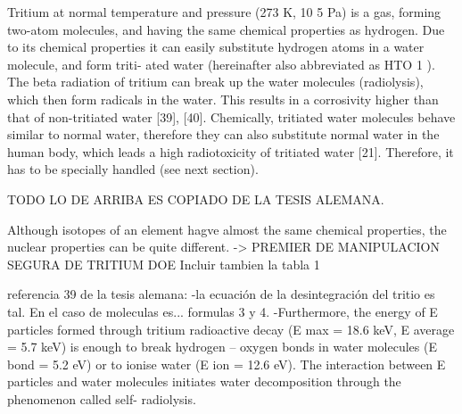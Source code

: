 Tritium at normal temperature and pressure (273 K, 10 5 Pa) is a gas, forming two-atom
molecules, and having the same chemical properties as hydrogen. Due to its chemical
properties it can easily substitute hydrogen atoms in a water molecule, and form triti-
ated water (hereinafter also abbreviated as HTO 1 ). The beta radiation of tritium can
break up the water molecules (radiolysis), which then form radicals in the water. This
results in a corrosivity higher than that of non-tritiated water [39], [40].
Chemically, tritiated water molecules behave similar to normal water, therefore they
can also substitute normal water in the human body, which leads a high radiotoxicity of
tritiated water [21]. Therefore, it has to be specially handled (see next section).


 

TODO LO DE ARRIBA ES COPIADO DE LA TESIS ALEMANA.

Although isotopes of an element hagve almost the same chemical properties, the nuclear properties can be quite different. -> PREMIER DE MANIPULACION SEGURA DE TRITIUM DOE
Incluir tambien la tabla 1

referencia 39 de la tesis alemana: 
-la ecuación de la desintegración del tritio es tal. En el caso de moleculas es... formulas 3 y 4.
-Furthermore, the energy of E particles formed
through tritium radioactive decay (E max = 18.6 keV,
E average = 5.7 keV) is enough to break hydrogen – oxygen
bonds in water molecules (E bond = 5.2 eV) or to ionise
water (E ion = 12.6 eV). The interaction between E
particles and water molecules initiates water
decomposition through the phenomenon called self-
radiolysis.

